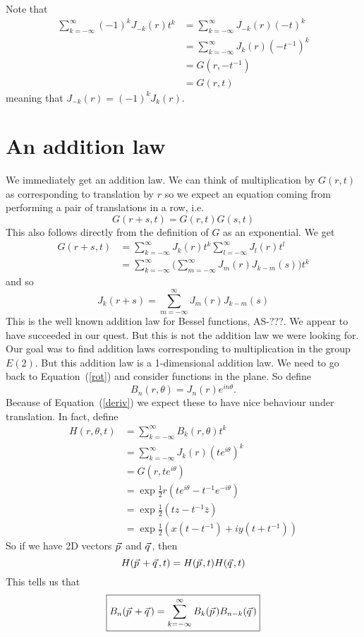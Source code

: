 \documentclass{article}
\newcommand\myvec[1]{\vec{#1}\hspace{0.5mm}}
\begin{document}
Note that
\begin{align*}
\sum_{k=-\infty}^\infty (-1)^kJ_{-k}(r)t^k
&= \sum_{k=-\infty}^\infty J_{-k}(r)(-t)^k \\
&= \sum_{k=-\infty}^\infty J_k(r)(-t^{-1})^k \\
&= G(r,-t^{-1}) \\
&= G(r,t)
\end{align*}
meaning that $J_{-k}(r) = (-1)^kJ_{k}(r)$.

\section{An addition law}
We immediately get an addition law.
We can think of multiplication by $G(r,t)$ as corresponding to translation by $r$ so we expect an equation coming from performing a pair of translations in a row, i.e.
\[
G(r+s,t) = G(r,t)G(s,t)
\]
This also follows directly from the definition of $G$ as an exponential.
We get
\begin{align*}
G(r+s,t) &= \sum_{k=-\infty}^\infty J_k(r)t^k\sum_{l=-\infty}^\infty J_l(r)t^l\\
&= \sum_{k=-\infty}^\infty \Big(\sum_{m=-\infty}^\infty J_{m}(r)J_{k-m}(s) \Big) t^k
\end{align*}
and so
\[
J_k(r+s) = \sum_{m=-\infty}^\infty J_{m}(r)J_{k-m}(s)
\]
This is the well known addition law for Bessel functions, AS-???.
We appear to have succeeded in our quest.
But this is not the addition law we were looking for.
Our goal was to find addition laws corresponding to multiplication in the group $E(2)$.
But this addition law is a 1-dimensional addition law.
We need to go back to Equation~(\ref{rot}) and consider functions in the plane.
So define
\[
\boxed{B_n(r,\theta) = J_n(r)e^{in\theta}}.
\]
Because of Equation~(\ref{deriv}) we expect these to have nice behaviour under translation.
In fact, define
\begin{align*}
H(r,\theta,t) &= \sum_{k=-\infty}^\infty B_k(r,\theta)t^k \\
&= \sum_{k=-\infty}^\infty J_k(r)(te^{i\theta})^k \\
&= G(r,te^{i\theta}) \\
&= \exp\frac{1}{2}r(te^{i\theta}-t^{-1}e^{-i\theta}) \\
&= \exp\frac{1}{2}(tz-t^{-1}\bar{z}) \\
&= \exp\frac{1}{2}(x(t-t^{-1})+iy(t+t^{-1}))
\end{align*}
So if we have 2D vectors $\myvec{p}$ and $\myvec{q}$, then
\[
H(\myvec{p}+\myvec{q},t) = H(\myvec{p},t)H(\myvec{q},t)
\]
This tells us that
\begin{equation}
\boxed{B_n(\myvec{p}+\myvec{q}) = \sum_{k=-\infty}^\infty B_k(\myvec{p})B_{n-k}(\myvec{q})}\label{addition}
\end{equation}
\end{document}
